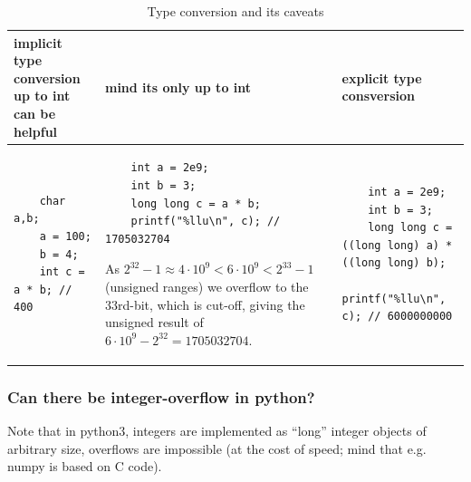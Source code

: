 \begin{table}[!htb]
    \centering
    \begin{tabular}{p{}|p{}|p{}}
        \textcolor{green1}{implicit type conversion up to int can be helpful} & \textcolor{red1}{mind its only up to int} & \textcolor{green1}{explicit type consversion} \\
        \hline
        \begin{minipage}[t]{0.3\textwidth}
        \begin{verbatim}
    char a,b;
    a = 100;
    b = 4;
    int c = a * b; // 400
        \end{verbatim}
        \end{minipage}
        &
        \begin{minipage}[t]{0.3\textwidth}
        \begin{verbatim}
    int a = 2e9;
    int b = 3;
    long long c = a * b;
    printf("%llu\n", c); // 1705032704
        \end{verbatim}
        As $2^{32} - 1 \approx 4\cdot 10^9 < 6 \cdot 10^9 < 2^{33} - 1$ (unsigned ranges) we overflow to the 33rd-bit, which is cut-off,
        giving the unsigned result of $6 \cdot 10^9 - 2^{32} = 1705032704$.
        \end{minipage}
        &
        \begin{minipage}[t]{0.3\textwidth}
        \begin{verbatim}
    int a = 2e9;
    int b = 3;
    long long c = ((long long) a) * ((long long) b);
    printf("%llu\n", c); // 6000000000            
        \end{verbatim}
        \end{minipage}
    \end{tabular}
    \caption{Type conversion and its caveats}
    \label{tab:type_conversion}
\end{table}

\subsubsection{Can there be integer-overflow in python?}
Note that in python3, integers are implemented as “long” integer objects of arbitrary size, overflows are
impossible (at the cost of speed; mind that e.g. numpy is based on C code).

